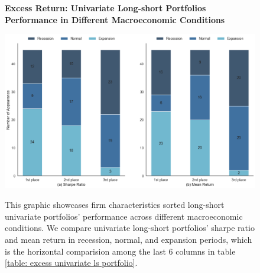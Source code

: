 \begin{figure}[H]
  \centering
  \caption{\textbf{Excess Return: Univariate Long-short Portfolios Performance in Different Macroeconomic Conditions}}
  \includegraphics[width=.8\textwidth]{images/univariant_ls_excess_comparing.png}
  \label{fig: excess univariate ls comparing}
  \caption*{\footnotesize{This graphic showcases firm characteristics sorted long-short univariate portfolios' performance across different macroeconomic conditions. We compare univariate long-short portfolios' sharpe ratio and mean return in recession, normal, and expansion periods, which is the horizontal comparision among the last 6 columns in table \ref{table: excess univariate ls portfolio}.}}
\end{figure}

